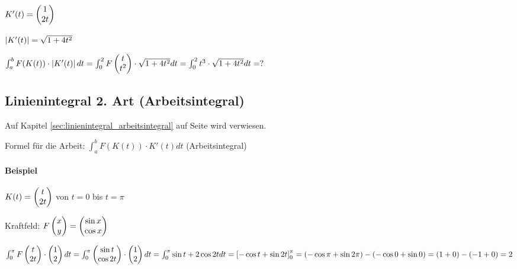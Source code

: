 $ K'(t) =  \begin{pmatrix} 1\\2t \end{pmatrix}  $

$  \left\vert K'(t) \right\vert  = \sqrt{1 + 4 t^2} $

$ \int_{a}^{b} F(K(t)) \cdot  \left\vert K'(t) \right\vert  dt 
= \int_0^2 F \begin{pmatrix} t\\t^2 \end{pmatrix}  \cdot \sqrt{1 + 4t^2} dt
= \int_{0}^{2} t^3 \cdot \sqrt{1 + 4t^2} dt
= ?
$

\subsection{Linienintegral 2. Art (Arbeitsintegral)}
Auf Kapitel \ref{sec:linienintegral_arbeitsintegral} auf Seite \pageref{sec:linienintegral_arbeitsintegral} wird verwiesen. 

Formel für die Arbeit: $\int_{a}^{b} F(K(t)) \cdot K'(t) dt$ (Arbeitsintegral) 

\paragraph{Beispiel}
$ K(t) =  \begin{pmatrix} t\\2t \end{pmatrix} $ von $t=0$ bis $t=\pi$

Kraftfeld: $F \begin{pmatrix} x\\y \end{pmatrix}  =  \begin{pmatrix} \sin x\\\cos x \end{pmatrix} $

$ \int_{0}^{\pi} F \begin{pmatrix} t\\2t \end{pmatrix}  \cdot  \begin{pmatrix} 1\\2 \end{pmatrix}  dt
=\int_{0}^{\pi}  \begin{pmatrix} \sin t\\\cos 2t \end{pmatrix}  \cdot  \begin{pmatrix} 1\\2 \end{pmatrix}  dt
=\int_{0}^{\pi} \sin t + 2\cos 2t dt 
=  \left[ -\cos t + \sin 2t \right] _{0}^{\pi}
= (-\cos \pi + \sin 2\pi) - (-\cos 0 + \sin 0)
= (1+0)-(-1+0)
= 2 
$ 
